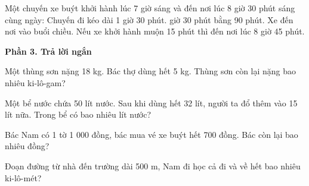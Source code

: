 \begin{ex} %
Một chuyến xe buýt khởi hành lúc 7 giờ sáng và đến nơi lúc 8 giờ 30 phút sáng cùng ngày:
\choiceTF
{\True Chuyến đi kéo dài 1 giờ 30 phút.}
{ giờ 30 phút bằng 90 phút.}
{Xe đến nơi vào buổi chiều.}
{\True Nếu xe khởi hành muộn 15 phút thì đến nơi lúc 8 giờ 45 phút.}
\end{ex}

\textbf{Phần 3. Trả lời ngắn}

\begin{ex} %
Một thùng sơn nặng 18 kg. Bác thợ dùng hết 5 kg. Thùng sơn còn lại nặng bao nhiêu ki-lô-gam?
\end{ex}

\begin{ex} %
Một bể nước chứa 50 lít nước. Sau khi dùng hết 32 lít, người ta đổ thêm vào 15 lít nữa. Trong bể có bao nhiêu lít nước?
\end{ex}

\begin{ex} %
Bác Nam có 1 tờ 1 000 đồng, bác mua vé xe buýt hết 700 đồng. Bác còn lại bao nhiêu đồng?
\end{ex}

\begin{ex} %
Đoạn đường từ nhà đến trường dài 500 m, Nam đi học cả đi và về hết bao nhiêu ki-lô-mét?
\end{ex}

